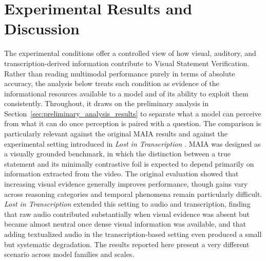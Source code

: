 \section{Experimental Results and Discussion}
\label{sec:experimental_results_discussion}
The experimental conditions offer a controlled view of how visual, auditory, and transcription-derived information contribute to Visual Statement Verification. Rather than reading multimodal performance purely in terms of absolute accuracy, the analysis below treats each condition as evidence of the informational resources available to a model and of its ability to exploit them consistently. Throughout, it draws on the preliminary analysis in Section~\ref{sec:preliminary_analysis_results} to separate what a model can perceive from what it can do once perception is paired with a question.
The comparison is particularly relevant against the original MAIA results \cite{testa2025maia} and against the experimental setting introduced in \textit{Lost in Transcription} \cite{deodati2026lost}. MAIA was designed as a visually grounded benchmark, in which the distinction between a true statement and its minimally contrastive foil is expected to depend primarily on information extracted from the video. The original evaluation showed that increasing visual evidence generally improves performance, though gains vary across reasoning categories and temporal phenomena remain particularly difficult. \textit{Lost in Transcription} extended this setting to audio and transcription, finding that raw audio contributed substantially when visual evidence was absent but became almost neutral once dense visual information was available, and that adding textualized audio in the transcription-based setting even produced a small but systematic degradation.
The results reported here present a very different scenario across model families and scales.
